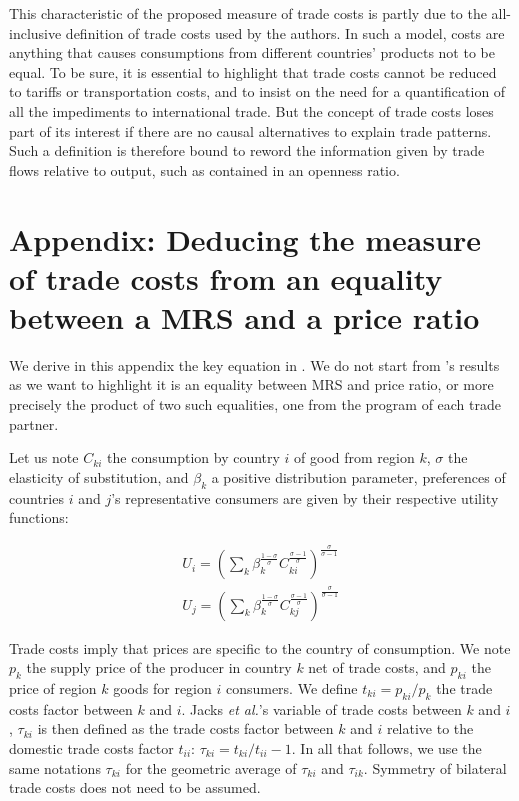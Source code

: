 \documentclass{article}
\begin{document}
This characteristic of the proposed measure of trade costs is
partly due to the all-inclusive definition of trade
costs used by the authors. In such a model, costs are anything
that causes consumptions from different countries' products not
to be equal. To be sure, it is essential to highlight that
trade costs cannot be reduced to tariffs or transportation
costs, and to insist on the need for a quantification of all
the impediments to international trade. But the concept of
trade costs loses part of its interest if there are no causal
alternatives to explain trade patterns. Such a definition is
therefore bound to reword the information given by trade
flows relative to output, such as contained in an openness
ratio.

\appendix

\section{\label{A1}Appendix: Deducing the measure of trade costs from an equality between a MRS and a price ratio}

We derive in this appendix the key equation in \cite{JMN2011}.
We do not start from \cite{AW2003}'s results as we want to
highlight it is an equality between MRS and price ratio, or
more precisely the product of two such equalities, one from the
program of each trade partner.

Let us note $C_{ki}$ the consumption by country $i$ of good from
region $k$, $\sigma$ the elasticity of substitution, and
$\beta_k$ a positive distribution parameter, preferences of
countries $i$ and $j$'s representative consumers are given by
their respective utility functions:

\begin{eqnarray*}
U_i=\left(\sum_k\beta_{k}^{\frac{1-\sigma}{\sigma}}C_{ki}^{\frac{\sigma-1}{\sigma}}\right)^{\frac{\sigma}{\sigma-1}}\\
U_j=\left(\sum_k\beta_{k}^{\frac{1-\sigma}{\sigma}}C_{kj}^{\frac{\sigma-1}{\sigma}}\right)^{\frac{\sigma}{\sigma-1}}
\end{eqnarray*}

Trade costs imply that prices are specific to the country of
consumption. We note $p_k$ the supply price of the producer in
country $k$ net of trade costs, and $p_{ki}$ the price of
region $k$ goods for region $i$ consumers. We define
$t_{ki}=p_{ki}/p_{k}$ the trade costs factor between $k$ and
$i$. Jacks \textit{et al.}'s variable of trade costs between $k$ and
$i$, $\tau_{ki}$ is then defined as the trade costs factor
between $k$ and $i$ relative to the domestic trade costs factor
$t_{ii}$: $\tau_{ki}=t_{ki}/t_{ii}-1$. In all that follows, we
use the same notations $\tau_{ki}$ for the geometric average of
$\tau_{ki}$ and $\tau_{ik}$. Symmetry of bilateral trade costs
does not need to be assumed.
\end{document}
